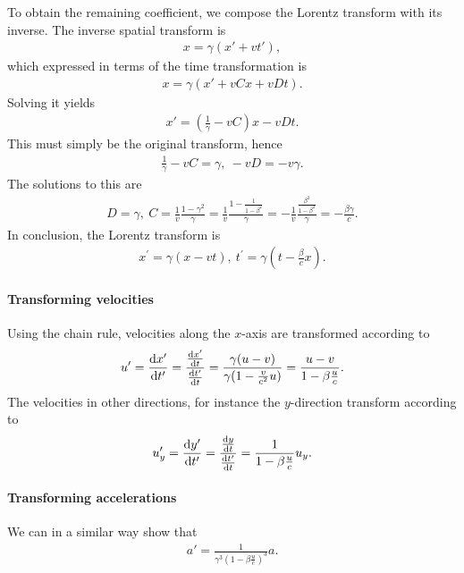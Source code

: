 To obtain the remaining coefficient, we compose the Lorentz transform with its inverse. The inverse spatial transform is
\begin{align*}
	x = \gamma(x' + vt'),
\end{align*}
which expressed in terms of the time transformation is
\begin{align*}
	x = \gamma(x' + vCx + vDt).
\end{align*}
Solving it yields
\begin{align*}
	x' = \left(\frac{1}{\gamma} - vC\right)x - vDt.
\end{align*}
This must simply be the original transform, hence
\begin{align*}
	\frac{1}{\gamma} - vC = \gamma, \ -vD = -v\gamma.
\end{align*}
The solutions to this are
\begin{align*}
	D = \gamma, \ C = \frac{1}{v}\frac{1 - \gamma^{2}}{\gamma} = \frac{1}{v}\frac{1 - \frac{1}{1 - \beta^{2}}}{\gamma} = -\frac{1}{v}\frac{\frac{\beta^{2}}{1 - \beta^{2}}}{\gamma} = -\frac{\beta\gamma}{c}.
\end{align*}
In conclusion, the Lorentz transform is
\begin{align*}
	x^{\prime} = \gamma(x - vt),\ t^{\prime} = \gamma\left(t - \frac{\beta}{c}x\right).
\end{align*}

\paragraph{Transforming velocities}
Using the chain rule, velocities along the $x$-axis are transformed according to
\begin{align*}
	u' = \dv{x'}{t'} = \frac{\dv{x'}{t}}{\dv{t'}{t}} = \frac{\gamma(u - v)}{\gamma(1 - \frac{v}{c^{2}}u)} = \frac{u - v}{1 - \beta\frac{u}{c}}.
\end{align*}
The velocities in other directions, for instance the $y$-direction transform according to
\begin{align*}
	u_{y}' = \dv{y'}{t'} = \frac{\dv{y}{t}}{\dv{t'}{t}} = \frac{1}{1 - \beta\frac{u}{c}}u_{y}.
\end{align*}

\paragraph{Transforming accelerations}
We can in a similar way show that
\begin{align*}
	a' = \frac{1}{\gamma^{3}\left(1 - \beta\frac{u}{c}\right)^{3}}a.
\end{align*}

